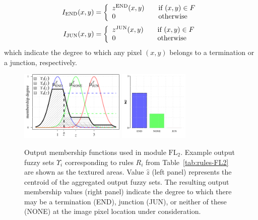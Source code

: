 \begin{equation}
I_{\textrm{END}}(x,y)=\left\{
\begin{array}{l@{\qquad}l}
z^{\textrm{END}}(x,y) & \textrm{if}\ (x,y)\in F \\
0 & \textrm{otherwise}
\end{array}
\right.
\end{equation}
\begin{equation}
I_{\textrm{JUN}}(x,y)=\left\{
\begin{array}{l@{\qquad}l}
z^{\textrm{JUN}}(x,y) & \textrm{if}\ (x,y)\in F \\
0 & \textrm{otherwise}
\end{array}
\right.
\end{equation}
which indicate the degree to which any pixel $(x,y)$ belongs to a termination or a junction, respectively.
\begin{figure}[ht!]
	\centering
	\includegraphics[height=9em]{fig10a_embedded}
	\includegraphics[height=9em]{fig10b_embedded}
	\caption{Output membership functions used in module $\mathrm{FL}_{2}$. Example output fuzzy sets $\Upsilon_{\!i}$ corresponding to rules $R_i$ from Table~\ref{tab:rules-FL2} are shown as the textured areas. Value $\hat{z}$ (left panel) represents the centroid of the aggregated output fuzzy sets. The resulting output membership values (right panel) indicate the degree to which there may be a termination (END), junction (JUN), or neither of these (NONE) at the image pixel location under consideration.}
	\label{ch2_fig10}
\end{figure}

